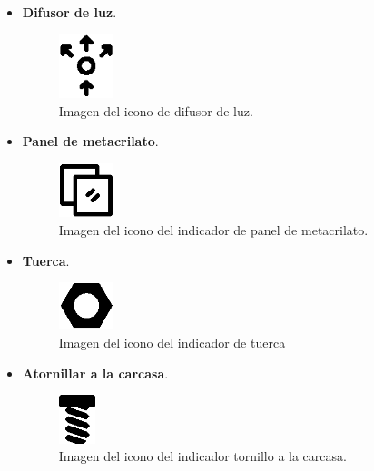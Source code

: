 \begin{itemize}
    \item \textbf{Difusor de luz}. 
    \begin{figure}[H]
        \centering
        \includegraphics[width=0.15\textwidth]{imagenes/Capitulos/Cap05/Difusion.png}
        \caption{Imagen del icono de difusor de luz.}
        \label{fig:difusionIcono}
    \end{figure}
    \newpage
    \item \textbf{Panel de metacrilato}. 
    \begin{figure}[H]
        \centering
        \includegraphics[width=0.15\textwidth]{imagenes/Capitulos/Cap05/Glass.png}
        \caption{Imagen del icono del indicador de panel de metacrilato.}
        \label{fig:MetacrilatoIcono}
    \end{figure}
    \item \textbf{Tuerca}. 
    \begin{figure}[H]
        \centering
        \includegraphics[width=0.15\textwidth]{imagenes/Capitulos/Cap05/Nut.png}
        \caption{Imagen del icono del indicador de tuerca}
        \label{fig:TuercaIcono}
    \end{figure}
    \item \textbf{Atornillar a la carcasa}. 
    \begin{figure}[H]
        \centering
        \includegraphics[width=0.1\textwidth]{imagenes/Capitulos/Cap05/Screw.png}
        \caption{Imagen del icono del indicador tornillo a la carcasa.}
        \label{fig:TornilloIcono}
    \end{figure}
\end{itemize}